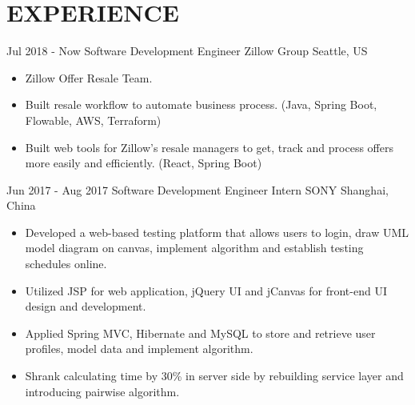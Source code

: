 \section{EXPERIENCE}

{\customcventry
{Jul 2018 - Now}
{Software Development Engineer}
{Zillow Group}
{Seattle, US}
{}
{
    \begin{itemize}
        \item Zillow Offer Resale Team.
        \item Built resale workflow to automate business process. (Java, Spring Boot, Flowable, AWS, Terraform) 
        \item Built web tools for Zillow's resale managers to get, track and process offers more easily and efficiently. (React, Spring Boot)
    \end{itemize}
}   
}

{\customcventry
{Jun 2017 - Aug 2017}
{Software Development Engineer Intern}
{SONY}
{Shanghai, China}
{}
{
    \begin{itemize}
        \item Developed a web-based testing platform that allows users to login, draw UML model diagram on canvas, implement algorithm and establish testing schedules online.
        \item Utilized JSP for web application, jQuery UI and jCanvas for front-end UI design and development.
        \item Applied Spring MVC, Hibernate and MySQL to store and retrieve user profiles, model data and implement algorithm.
        \item Shrank calculating time by 30\% in server side by rebuilding service layer and introducing pairwise algorithm.
    \end{itemize}
}   
}